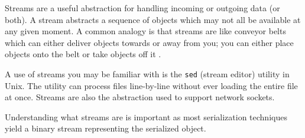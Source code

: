 Streams are a useful abstraction for handling incoming or outgoing data (or both). A stream abstracts a sequence of objects which may not all be available at any given moment. A common analogy is that streams are like conveyor belts which can either deliver objects towards or away from you; you can either place objects onto the belt or take objects off it \cite{so_streams}.

A use of streams you may be familiar with is the \texttt{sed} (stream editor) utility in Unix. The utility can process files line-by-line without ever loading the entire file at once. Streams are also the abstraction used to support network sockets. 

Understanding what streams are is important as most serialization techniques yield a binary stream representing the serialized object. 
